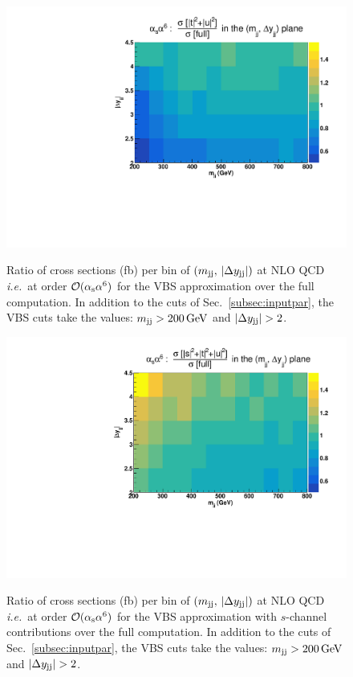 \begin{figure}[hbt]
\centering
{\includegraphics[scale=0.39]{figures/scanfigures/a6as_vbfnloVSrecola_tu.pdf}}
\caption{Ratio of cross sections (fb) per bin of $(m_{\text{j}\text{j}},\,|\Delta y_{\text{j}\text{j}}|)$ at NLO QCD \emph{i.e.}\ at order $\mathcal{O}(\alpha_\text{s}\alpha^6)$ for the VBS approximation over the full computation.
In addition to the cuts of Sec.~\ref{subsec:inputpar}, the VBS cuts take the values: $m_{\text{j}\text{j}}>200 \,\text{GeV}$ and $|\Delta y_{\Pj\Pj}|>2$.}
\label{fig:ratio2d_NLO}
\end{figure}
%
\begin{figure}[hbt]
\centering
{\includegraphics[scale=0.39]{figures/scanfigures/a6as_vbfnloVSrecola_stu.pdf}}
\caption{Ratio of cross sections (fb) per bin of $(m_{\text{j}\text{j}},\,|\Delta y_{\text{j}\text{j}}|)$ at NLO QCD \emph{i.e.}\ at order $\mathcal{O}(\alpha_\text{s}\alpha^6)$ for the VBS approximation with $s$-channel contributions over the full computation.
In addition to the cuts of Sec.~\ref{subsec:inputpar}, the VBS cuts take the values: $m_{\text{j}\text{j}}>200 \,\text{GeV}$ and $|\Delta y_{\Pj\Pj}|>2$.}
\label{fig:mjjdyjj_2d_NLO}
\end{figure}

